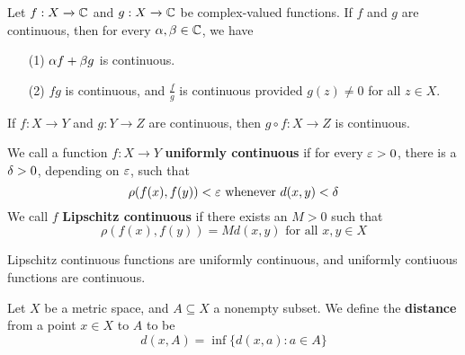 \begin{lemma}\label{2.5.3}
    Let $f:X \xrightarrow{} \mathbb{C}$ and $g:X \xrightarrow{} \mathbb{C}$ be complex-valued
    functions. If $f$ and $g$ are continuous, then for every $\alpha,\beta \in \mathbb{C}$, we
    have
    \begin{enumerate}
        \item[(1)] $\alpha f+\beta g$ is continuous.

        \item[(2)] $fg$ is continuous, and  $\frac{f}{g}$ is continuous provided
            $g(z) \neq 0$ for all $z \in X$.
    \end{enumerate}
\end{lemma}

\begin{lemma}\label{2.5.4}
    If $f:X \xrightarrow{} Y$ and $g:Y \xrightarrow{} Z$ are continuous, then $g
    \circ f:X \xrightarrow{} Z$ is continuous.
\end{lemma}

\begin{definition}
    We call a function $f:X \xrightarrow{} Y$ \textbf{uniformly continuous} if
    for every $\varepsilon>0$, there is a  $\delta>0$, depending on  $\varepsilon$, such that
    \begin{equation*}
        \rho(f(x),f(y))<\varepsilon \text{ whenever } d(x,y)<\delta
    \end{equation*}
    We call $f$  \textbf{Lipschitz continuous} if there exists an $M>0$ such
    that
    \begin{equation*}
        \rho(f(x),f(y))=Md(x,y) \text{ for all } x,y \in X
    \end{equation*}
\end{definition}

\begin{lemma}\label{2.5.5}
    Lipschitz continuous functions are uniformly continuous, and uniformly
    contiuous functions are continuous.
\end{lemma}

\begin{definition}
    Let $X$ be a metric space, and  $A \subseteq X$ a nonempty subset. We define
    the  \textbf{distance} from a point $x \in X$ to  $A$ to be
    \begin{equation*}
        d(x,A)=\inf{\{d(x,a) : a \in A\}}
    \end{equation*}
\end{definition}

